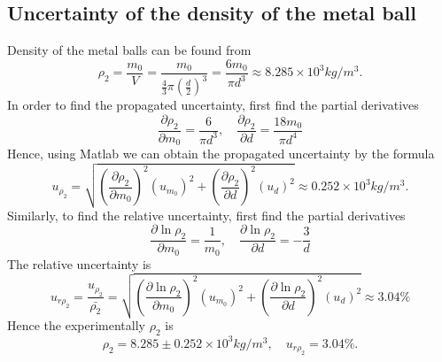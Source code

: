 \subsection{Uncertainty of the density of the metal ball}
    Density of the metal balls can be found from
    \[
        \rho_2=\frac{m_0}{V}=\frac{m_0}{\frac{4}{3}\pi(\frac{d}{2})^3}=\frac{6m_0}{\pi d^3}\approx 8.285\times10^3 kg/m^3.
    \]
    In order to find the propagated uncertainty, first find the partial derivatives
    \[
        \frac{\partial\rho_2}{\partial m_0}=\frac{6}{\pi d^3},\quad
        \frac{\partial\rho_2}{\partial d}=\frac{18m_0}{\pi d^4}
    \]
    Hence, using Matlab we can obtain the propagated uncertainty by the formula
    \[
        u_{\rho_2}=\sqrt{(\frac{\partial\rho_2}{\partial m_0})^2(u_{m_0})^2+(\frac{\partial\rho_2}{\partial d})^2(u_d)^2}\approx 0.252\times10^3kg/m^3.
    \]
    Similarly, to find the relative uncertainty, first find the partial derivatives
    \[
        \frac{\partial\ln\rho_2}{\partial m_0}=\frac{1}{m_0},\quad
        \frac{\partial\ln\rho_2}{\partial d}=-\frac{3}{d}
    \]
    The relative uncertainty is
    \[
        u_{r\rho_2}=\frac{u_{\rho_2}}{\bar{\rho_2}}=\sqrt{(\frac{\partial \ln\rho_2}{\partial m_0})^2(u_{m_0})^2+(\frac{\partial \ln\rho_2}{\partial d})^2(u_d)^2}\approx 3.04\%
    \]
    Hence the experimentally $\rho_2$ is
    \[
        \rho_2=8.285\pm 0.252\times10^3kg/m^3, \quad u_{r\rho_2}=3.04\%.
    \]


